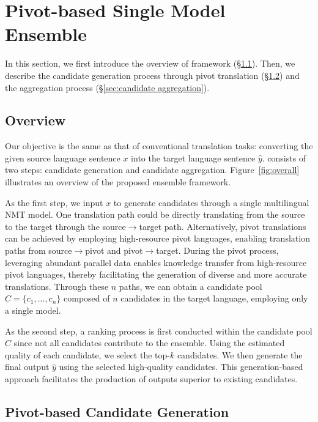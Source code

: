 \section{Pivot-based Single Model Ensemble}
\label{sec:Pivot-based Single Model Ensemble}



In this section, we first introduce the overview of \ours framework (\S\ref{sec:overview}).
Then, we describe the candidate generation process through pivot translation (\S\ref{sec:pivot-based candidate generation}) and the aggregation process (\S\ref{sec:candidate aggregation}).


\subsection{Overview}
\label{sec:overview}

Our objective is the same as that of conventional translation tasks: converting the given source language sentence $x$ into the target language sentence $\hat{y}$.
\ours consists of two steps: candidate generation and candidate aggregation.
Figure~\ref{fig:overall} illustrates an overview of the proposed ensemble framework.


As the first step, we input $x$ to generate candidates through a single multilingual NMT model.
One translation path could be directly translating from the source to the target through the source$\rightarrow$target path.
Alternatively, pivot translations can be achieved by employing high-resource pivot languages, enabling translation paths from source$\rightarrow$pivot and pivot$\rightarrow$target.
During the pivot process, leveraging abundant parallel data enables knowledge transfer from high-resource pivot languages, thereby facilitating the generation of diverse and more accurate translations.
Through these $n$ paths, we can obtain a candidate pool $C = \{c_1, ..., c_n\}$ composed of $n$ candidates in the target language, employing only a single model.

As the second step, a ranking process is first conducted within the candidate pool $C$ since not all candidates contribute to the ensemble.
Using the estimated quality of each candidate, we select the top-$\textit{k}$ candidates.
We then generate the final output $\hat{y}$ using the selected high-quality candidates.
This generation-based approach facilitates the production of outputs superior to existing candidates.


\subsection{Pivot-based Candidate Generation}
\label{sec:pivot-based candidate generation}



